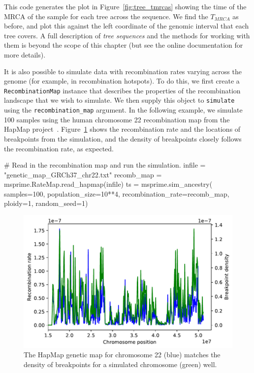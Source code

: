 \documentclass[graybox]{svmult}
\begin{document}
This code generates the plot in Figure~\ref{fig:tree_tmrcas} showing the time of the MRCA of the sample for each tree across the
sequence. We find the \(T_{MRCA}\) as before, and plot this against the
left coordinate of the genomic interval that each tree covers. A full description of
\emph{tree sequences} and the methods for working with them is beyond the scope of this chapter (but see the online documentation for more details).

It is also possible to simulate data with recombination rates varying
across the genome (for example, in recombination hotspots). To do this, we
first create a \texttt{RecombinationMap} instance that describes the
properties of the recombination landscape that we wish to simulate. We
then supply this object to \texttt{simulate} using the
\texttt{recombination\_map} argument. In the following example, we
simulate 100 samples using the human chromosome 22 recombination map
from the HapMap project~\citep{international2003international}.
Figure~\ref{fig:variable_recombination} shows the
recombination rate and the locations of breakpoints
from the simulation, and the density of breakpoints closely follows the
recombination rate, as expected.

\begin{pythoncode}
# Read in the recombination map and run the simulation.
infile = "genetic_map_GRCh37_chr22.txt"
recomb_map = msprime.RateMap.read_hapmap(infile)
ts = msprime.sim_ancestry(
    samples=100,
    population_size=10**4,
    recombination_rate=recomb_map,
    ploidy=1,
    random_seed=1)
\end{pythoncode}

\begin{figure}
\begin{center}
\includegraphics[width=\textwidth]{images/plot_11.pdf}
\end{center}
\caption{\label{fig:variable_recombination} The HapMap
genetic map for chromosome 22 (blue) matches the density of breakpoints for a simulated chromosome (green) well.}
\end{figure}
\end{document}
